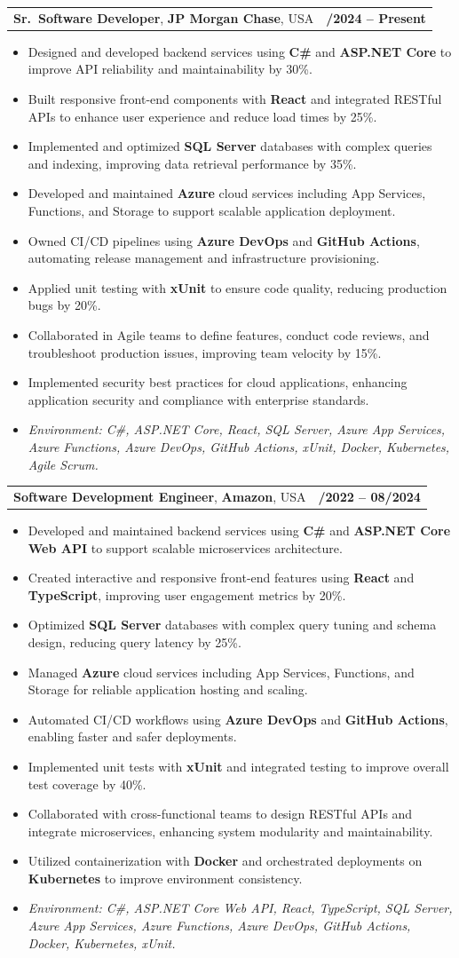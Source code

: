 \documentclass[letterpaper,11pt]{article}
\makeatletter
\newcommand{\resumeItem}[1]{
  \item\footnotesize{
    {#1 \vspace{-2pt}}
  }
}
\newcommand{\resumeSubheading}[4]{
  \vspace{-2pt}\item
    \begin{tabular*}{1.0\textwidth}[t]{l@{\extracolsep{\fill}}r}
      \textbf{\fontsize{10pt}{14pt}\selectfont #3}, \textbf{\fontsize{10pt}{14pt}\selectfont #1}, \fontsize{10pt}{14pt}\selectfont #4 & \textbf{\fontsize{10pt}{14pt}\selectfont #2} \\
    \end{tabular*}\vspace{-7pt}
}
\newcommand{\resumeItemListStart}{\begin{itemize}[leftmargin=*]}
\newcommand{\resumeItemListEnd}{\end{itemize}\vspace{-5pt}}
\makeatother
\begin{document}
\resumeSubheading
{JP Morgan Chase}{09/2024 -- Present}
{Sr.\ Software Developer}{USA}
\resumeItemListStart
  \resumeItem{Designed and developed backend services using \textbf{C\#} and \textbf{ASP.NET Core} to improve API reliability and maintainability by 30\%.}
  \resumeItem{Built responsive front-end components with \textbf{React} and integrated RESTful APIs to enhance user experience and reduce load times by 25\%.}
  \resumeItem{Implemented and optimized \textbf{SQL Server} databases with complex queries and indexing, improving data retrieval performance by 35\%.}
  \resumeItem{Developed and maintained \textbf{Azure} cloud services including App Services, Functions, and Storage to support scalable application deployment.}
  \resumeItem{Owned CI/CD pipelines using \textbf{Azure DevOps} and \textbf{GitHub Actions}, automating release management and infrastructure provisioning.}
  \resumeItem{Applied unit testing with \textbf{xUnit} to ensure code quality, reducing production bugs by 20\%.}
  \resumeItem{Collaborated in Agile teams to define features, conduct code reviews, and troubleshoot production issues, improving team velocity by 15\%.}
  \resumeItem{Implemented security best practices for cloud applications, enhancing application security and compliance with enterprise standards.}
  \resumeItem{\textit{Environment: C\#, ASP.NET Core, React, SQL Server, Azure App Services, Azure Functions, Azure DevOps, GitHub Actions, xUnit, Docker, Kubernetes, Agile Scrum.}}
\resumeItemListEnd

\resumeSubheading
{Amazon}{10/2022 -- 08/2024}
{Software Development Engineer}{USA}
\resumeItemListStart
  \resumeItem{Developed and maintained backend services using \textbf{C\#} and \textbf{ASP.NET Core Web API} to support scalable microservices architecture.}
  \resumeItem{Created interactive and responsive front-end features using \textbf{React} and \textbf{TypeScript}, improving user engagement metrics by 20\%.}
  \resumeItem{Optimized \textbf{SQL Server} databases with complex query tuning and schema design, reducing query latency by 25\%.}
  \resumeItem{Managed \textbf{Azure} cloud services including App Services, Functions, and Storage for reliable application hosting and scaling.}
  \resumeItem{Automated CI/CD workflows using \textbf{Azure DevOps} and \textbf{GitHub Actions}, enabling faster and safer deployments.}
  \resumeItem{Implemented unit tests with \textbf{xUnit} and integrated testing to improve overall test coverage by 40\%.}
  \resumeItem{Collaborated with cross-functional teams to design RESTful APIs and integrate microservices, enhancing system modularity and maintainability.}
  \resumeItem{Utilized containerization with \textbf{Docker} and orchestrated deployments on \textbf{Kubernetes} to improve environment consistency.}
  \resumeItem{\textit{Environment: C\#, ASP.NET Core Web API, React, TypeScript, SQL Server, Azure App Services, Azure Functions, Azure DevOps, GitHub Actions, Docker, Kubernetes, xUnit.}}
\resumeItemListEnd
\end{document}
